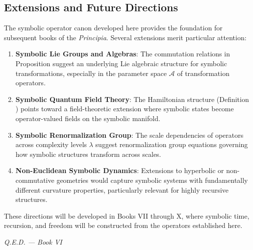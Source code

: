 \subsection{Extensions and Future Directions}
\label{subsection:bk6_extensions_and_future_directions}
The symbolic operator canon developed here provides the foundation for subsequent books of the \textit{Principia}. Several extensions merit particular attention:
\begin{enumerate}
\item \textbf{Symbolic Lie Groups and Algebras}: The commutation relations in Proposition  suggest an underlying Lie algebraic structure for symbolic transformations, especially in the parameter space $\mathcal{A}$ of transformation operators.
\item \textbf{Symbolic Quantum Field Theory}: The Hamiltonian structure (Definition ) points toward a field-theoretic extension where symbolic states become operator-valued fields on the symbolic manifold.
\item \textbf{Symbolic Renormalization Group}: The scale dependencies of operators across complexity levels $\lambda$ suggest renormalization group equations governing how symbolic structures transform across scales.
\item \textbf{Non-Euclidean Symbolic Dynamics}: Extensions to hyperbolic or non-commutative geometries would capture symbolic systems with fundamentally different curvature properties, particularly relevant for highly recursive structures.
\end{enumerate}
These directions will be developed in Books VII through X, where symbolic time, recursion, and freedom will be constructed from the operators established here.
\vspace{1em}
\begin{flushright}
\textit{Q.E.D. — Book VI}
\end{flushright}